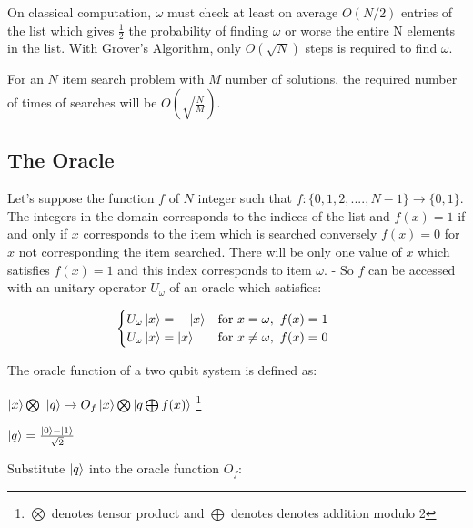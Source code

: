 \documentclass{article}
\begin{document}
\noindent
On classical computation, $\omega$ must check at least on average $O(N/2)$ entries of the list which gives $\frac{1}{2}$ the probability of finding $\omega$ or worse the entire N elements in the list.
With Grover's Algorithm, only $O(\sqrt{N})$ steps is required to find $\omega$.
\vspace{5mm}

\noindent
For an $N$ item search problem with $M$ number of solutions, the required number of times of searches will be $O(\sqrt{\frac{N}{M}})$.
\pagebreak

\subsection{The Oracle}

Let's suppose the function $f$ of $N$ integer such that $f:\{0,1, 2,...., N-1\} \rightarrow{\{0,1\}}$. The integers in the domain corresponds to the indices of the list and $f(x) =1$ if and only if $x$ corresponds to the item which is searched conversely $f(x) =0$ for $x$ not corresponding the item searched. There will be only one value of $x$ which satisfies $f(x)=1$ and this index corresponds to item $\omega$.
\noindent
\vspace{5mm}
-
So $f$ can be accessed with an unitary operator $U_{\omega}$ of  an oracle which satisfies:
\vspace{5mm}

$\hspace{30mm} \begin{cases}
      U_{\omega}\ket{x} = -\ket{x}  & \text{for} \ x = \omega, \ f(x) =1 \\
       U_{\omega}\ket{x} = \ket{x}  & \text{for} \ x \neq \omega, \ f(x) = 0 \\
\end{cases}$
\vspace{5mm}

The oracle function of a two qubit system is defined as:
\vspace{5mm}

\qquad $\ket{x} \bigotimes\ \ket{q} \rightarrow{O_f} \ket{x} \bigotimes \ket{q \bigoplus f(x)}$ \footnote{$\bigotimes$ denotes tensor product and $\bigoplus$ denotes denotes addition modulo 2}
\vspace{5mm}

\qquad $\ket{q} = \frac{\ket{0} - \ket{1}}{\sqrt{2}}$
\vspace{5mm}

Substitute $\ket{q}$ into the oracle function $O_f$:
\vspace{5mm}
\end{document}
